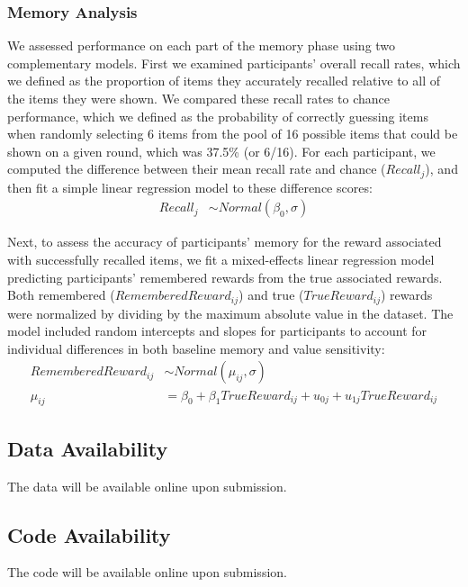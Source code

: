 \documentclass[10pt,letterpaper]{article}
\begin{document}
\subsubsection{Memory Analysis}

We assessed performance on each part of the memory phase using two complementary models. First we examined participants' overall recall rates, which we defined as the proportion of items they accurately recalled relative to all of the items they were shown. We compared these recall rates to chance performance, which we defined as the probability of correctly guessing items when randomly selecting 6 items from the pool of 16 possible items that could be shown on a given round, which was 37.5\% (or 6/16). For each participant, we computed the difference between their mean recall rate and chance ($Recall_j$), and then fit a simple linear regression model to these difference scores:
\begin{align*}
Recall_j &\sim Normal(\beta_0, \sigma)
\end{align*}

Next, to assess the accuracy of participants' memory for the reward associated with successfully recalled items, we fit a mixed-effects linear regression model predicting participants' remembered rewards from the true associated rewards. Both remembered ($RememberedReward_{ij}$) and true ($TrueReward_{ij}$) rewards were normalized by dividing by the maximum absolute value in the dataset. The model included random intercepts and slopes for participants to account for individual differences in both baseline memory and value sensitivity:
\begin{align*}
RememberedReward_{ij} &\sim Normal(\mu_{ij}, \sigma) \\
\mu_{ij} &= \beta_0 + \beta_1TrueReward_{ij} \nonumber + u_{0j} + u_{1j}TrueReward_{ij}
\end{align*}

\subsection{Data Availability} The data will be available online upon submission.

\subsection{Code Availability} The code will be available online upon submission.



\end{document}
